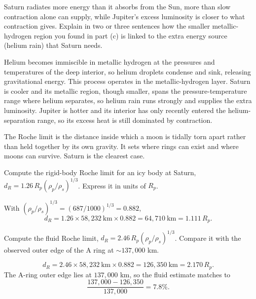 \parti Saturn radiates more energy than it absorbs from the Sun, more than slow contraction alone can supply, while Jupiter's excess luminosity is closer to what contraction gives. Explain in two or three sentences how the smaller metallic-hydrogen region you found in part (c) is linked to the extra energy source (helium rain) that Saturn needs.

\begin{solution}
Helium becomes immiscible in metallic hydrogen at the pressures and temperatures of the deep interior, so helium droplets condense and sink, releasing gravitational energy.
This process operates in the metallic-hydrogen layer.
Saturn is cooler and its metallic region, though smaller, spans the pressure-temperature range where helium separates, so helium rain runs strongly and supplies the extra luminosity.
Jupiter is hotter and its interior has only recently entered the helium-separation range, so its excess heat is still dominated by contraction.
\end{solution}



The Roche limit is the distance inside which a moon is tidally torn apart rather than held together by its own gravity.
It sets where rings can exist and where moons can survive.
Saturn is the clearest case.

\parti Compute the rigid-body Roche limit for an icy body at Saturn, $d_R = 1.26\,R_p(\rho_p/\rho_s)^{1/3}$. Express it in units of $R_p$.

\begin{solution}
With $(\rho_p/\rho_s)^{1/3} = (687/1000)^{1/3} = 0.882$,
\[
d_R = 1.26 \times 58{,}232\ \mathrm{km} \times 0.882 = 64{,}710\ \mathrm{km} = 1.111\,R_p.
\]
\end{solution}

\parti Compute the fluid Roche limit, $d_R = 2.46\,R_p(\rho_p/\rho_s)^{1/3}$. Compare it with the observed outer edge of the A ring at $\sim 137{,}000$ km.

\begin{solution}
\[
d_R = 2.46 \times 58{,}232\ \mathrm{km} \times 0.882 = 126{,}350\ \mathrm{km} = 2.170\,R_p.
\]
The A-ring outer edge lies at $137{,}000$ km, so the fluid estimate matches to
\[
\frac{137{,}000 - 126{,}350}{137{,}000} = 7.8\%.
\]
\end{solution}

